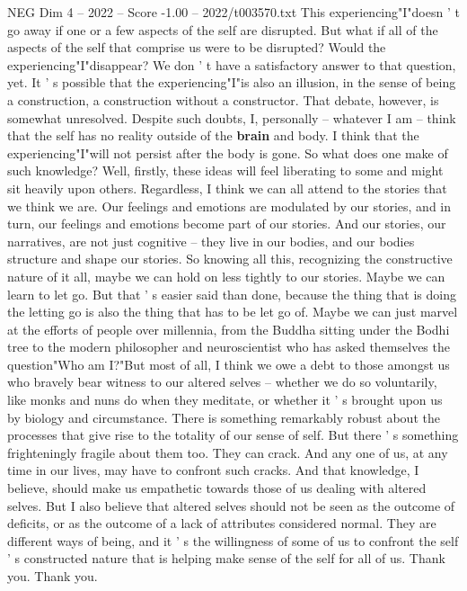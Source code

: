 \begin{textsample}{NEG Dim 4 – 2022 – Score -1.00 – 2022/t003570.txt}
This experiencing"I"doesn ' t go away if one or a few aspects of the self are disrupted.
But what if all of the aspects of the self that comprise us were to be disrupted?
Would the experiencing"I"disappear?
We don ' t have a satisfactory answer to that question, yet.
It ' s possible that the experiencing"I"is also an illusion, in the sense of being a construction, a construction without a constructor.
That debate, however, is somewhat unresolved.
Despite such doubts, I, personally -- whatever I am -- think that the self has no reality outside of the \textbf{brain} and body.
I think that the experiencing"I"will not persist after the body is gone.
So what does one make of such knowledge?
Well, firstly, these ideas will feel liberating to some and might sit heavily upon others.
Regardless, I think we can all attend to the stories that we think we are.
Our feelings and emotions are modulated by our stories, and in turn, our feelings and emotions become part of our stories.
And our stories, our narratives, are not just cognitive -- they live in our bodies, and our bodies structure and shape our stories.
So knowing all this, recognizing the constructive nature of it all, maybe we can hold on less tightly to our stories.
Maybe we can learn to let go.
But that ' s easier said than done, because the thing that is doing the letting go is also the thing that has to be let go of.
Maybe we can just marvel at the efforts of people over millennia, from the Buddha sitting under the Bodhi tree to the modern philosopher and neuroscientist who has asked themselves the question"Who am I?"But most of all, I think we owe a debt to those amongst us who bravely bear witness to our altered selves -- whether we do so voluntarily, like monks and nuns do when they meditate, or whether it ' s brought upon us by biology and circumstance.
There is something remarkably robust about the processes that give rise to the totality of our sense of self.
But there ' s something frighteningly fragile about them too.
They can crack.
And any one of us, at any time in our lives, may have to confront such cracks.
And that knowledge, I believe, should make us empathetic towards those of us dealing with altered selves.
But I also believe that altered selves should not be seen as the outcome of deficits, or as the outcome of a lack of attributes considered normal.
They are different ways of being, and it ' s the willingness of some of us to confront the self ' s constructed nature that is helping make sense of the self for all of us.
Thank you.
Thank you.

\end{textsample}
